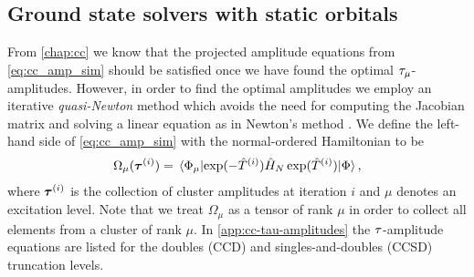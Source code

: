        \subsection{Ground state solvers with static orbitals}
            \label{subsec:gs-cc}
            From \autoref{chap:cc} we know that the projected amplitude
            equations from \autoref{eq:cc_amp_sim} should be satisfied once we
            have found the optimal $\tau_{\mu}$-amplitudes.
            However, in order to find the optimal amplitudes we employ an
            iterative \emph{quasi-Newton} method which avoids the need for
            computing the Jacobian matrix and solving a linear equation as in
            Newton's method \cite{helgaker-molecular}.
            We define the left-hand side of \autoref{eq:cc_amp_sim} with the
            normal-ordered Hamiltonian to be
            \begin{align}
                \Omega_{\mu}(\vfg{\clustamp}^{(i)})
                = \mel*{\slat_{\mu}}{
                    \exponential(-\clust^{(i)})
                    \hamil_N
                    \exponential(\clust^{(i)})
                }{\slat},
            \end{align}
            where $\boldsymbol{\tau}^{(i)}$ is the collection of cluster
            amplitudes at iteration $i$ and $\mu$ denotes an excitation level.
            Note that we treat $\Omega_{\mu}$ as a tensor of rank $\mu$ in
            order to collect all elements from a cluster of rank $\mu$.
            In \autoref{app:cc-tau-amplitudes} the $\tau$-amplitude
            equations are listed for the doubles (CCD) and singles-and-doubles
            (CCSD) truncation levels.

